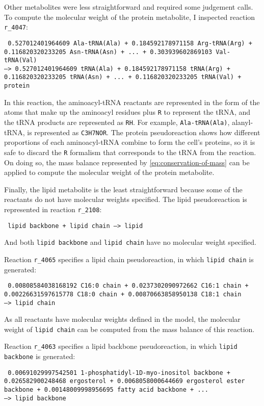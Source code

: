 Other metabolites were less straightforward and required some judgement calls.
To compute the molecular weight of the protein metabolite, I inspected reaction \texttt{r\_4047}:

\texttt{
  0.527012401964609 Ala-tRNA(Ala) + 0.184592178971158 Arg-tRNA(Arg) + 0.116820320233205 Asn-tRNA(Asn) + ... + 0.303939602869103 Val-tRNA(Val)
  \\ --> 0.527012401964609 tRNA(Ala) + 0.184592178971158 tRNA(Arg) + 0.116820320233205 tRNA(Asn) + ... + 0.116820320233205 tRNA(Val) + protein
}

In this reaction, the aminoacyl-tRNA reactants are represented in the form of the atoms that make up the aminoacyl residues plus \texttt{R} to represent the tRNA, and the tRNA products are represented as \texttt{RH}.
For example, \texttt{Ala-tRNA(Ala)}, alanyl-tRNA, is represented as \texttt{C3H7NOR}.
The protein pseudoreaction shows how different proportions of each aminoacyl-tRNA combine to form the cell's proteins, so it is safe to discard the \texttt{R} formalism that corresponds to the tRNA from the reaction.
On doing so, the mass balance represented by \ref{eq:conservation-of-mass} can be applied to compute the molecular weight of the protein metabolite.

Finally, the lipid metabolite is the least straightforward because some of the reactants do not have molecular weights specified.
The lipid pseudoreaction is represented in reaction \texttt{r\_2108}:

\texttt{
  lipid backbone + lipid chain --> lipid
}

And both \texttt{lipid backbone} and \texttt{lipid chain} have no molecular weight specified.

Reaction \texttt{r\_4065} specifies a lipid chain pseudoreaction, in which \texttt{lipid chain} is generated:

\texttt{
  0.00808584038168192 C16:0 chain + 0.0237302090972662 C16:1 chain + 0.00226631597615778 C18:0 chain + 0.00870663858950138 C18:1 chain
  \\ --> lipid chain
}

As all reactants have molecular weights defined in the model, the molecular weight of \texttt{lipid chain} can be computed from the mass balance of this reaction.

Reaction \texttt{r\_4063} specifies a lipid backbone pseudoreaction, in which \texttt{lipid backbone} is generated:

\texttt{
  0.00691029997542501 1-phosphatidyl-1D-myo-inositol backbone + 0.026582900248468 ergosterol + 0.0068058000644669 ergosterol ester backbone + 0.00148009998956695 fatty acid backbone + ...
  \\ --> lipid backbone
}

